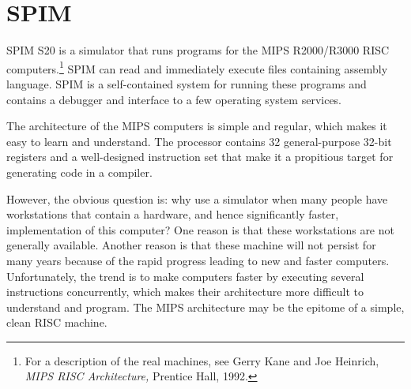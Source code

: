 \date{Copyright \copyright 1990--1997 by James R. Larus \\
      (This document may be copied without royalties, \\
	so long as this copyright notice remains on it.)}

\maketitle


\newcommand {\pinst} [2]%
	{\bigskip\noindent{\em{{\tt #1}\hfill#2 ${}^{\dagger}$\newline}}}
\newcommand {\inst} [2]%
	 {\bigskip\noindent{\em{{\tt #1}\hfill#2\newline}}}
\newcommand {\pinstX} [2]%
	{\noindent{\em{{\tt #1}\hfill#2 ${}^{\dagger}$\newline}}}
\newcommand {\instX} [2]%
	{\noindent{\em{{\tt #1}\hfill#2\newline}}}


\section{SPIM}

SPIM S20 is a simulator that runs programs for the MIPS R2000/R3000 RISC
computers.\footnote{For a description of the real machines, see Gerry Kane
and Joe Heinrich, {\em MIPS RISC Architecture,\/} Prentice Hall, 1992.} SPIM
can read and immediately execute files containing assembly language.  SPIM
is a self-contained system for running these programs and contains a
debugger and interface to a few operating system services.

The architecture of the MIPS computers is simple and regular, which
makes it easy to learn and understand.  The processor contains 32
general-purpose 32-bit registers and a well-designed instruction set that
make it a propitious target for generating code in a compiler.

However, the obvious question is: why use a simulator when many people
have workstations that contain a hardware, and hence significantly
faster, implementation of this computer?  One reason is that these
workstations are not generally available.  Another reason is that
these machine will not persist for many years because of the rapid
progress leading to new and faster computers.  Unfortunately, the
trend is to make computers faster by executing several instructions
concurrently, which makes their architecture more difficult to
understand and program.  The MIPS architecture may be the epitome of a
simple, clean RISC machine.

